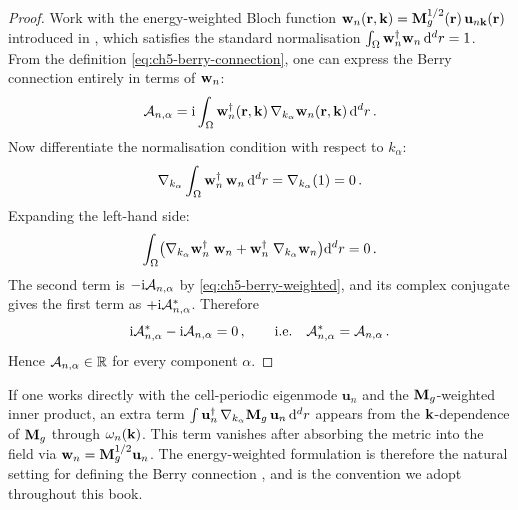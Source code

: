 \begin{proof}
Work with the energy-weighted Bloch function
$\mathbf{w}_n(\mathbf{r},\mathbf{k})=\mathbf{M}_g^{1/2}(\mathbf{r})\,\mathbf{u}_{n\mathbf{k}}(\mathbf{r})$
introduced in , which satisfies the standard
normalisation $\int_\Omega\mathbf{w}_n^\dagger\mathbf{w}_n\,\mathrm{d}^d r=1$.
From the definition \eqref{eq:ch5-berry-connection}, one can express the Berry
connection entirely in terms of $\mathbf{w}_n$:
\begin{equation}\label{eq:ch5-berry-weighted}
  \mathcal{A}_{n,\alpha}
  = \mathrm{i}\int_\Omega\mathbf{w}_n^\dagger(\mathbf{r},\mathbf{k})\,
  \nabla_{k_\alpha}\mathbf{w}_n(\mathbf{r},\mathbf{k})\,\mathrm{d}^d r\,.
\end{equation}
Now differentiate the normalisation condition with respect to $k_\alpha$:
\begin{equation}\label{eq:ch5-norm-deriv}
  \nabla_{k_\alpha}\int_\Omega
  \mathbf{w}_n^\dagger\,\mathbf{w}_n\,\mathrm{d}^d r
  = \nabla_{k_\alpha}(1) = 0\,.
\end{equation}
Expanding the left-hand side:
\begin{equation}
  \int_\Omega\bigl(
    \nabla_{k_\alpha}\mathbf{w}_n^\dagger\;\mathbf{w}_n
    + \mathbf{w}_n^\dagger\;\nabla_{k_\alpha}\mathbf{w}_n
  \bigr)\mathrm{d}^d r = 0\,.
\end{equation}
The second term is $-\mathrm{i}\mathcal{A}_{n,\alpha}$ by
\eqref{eq:ch5-berry-weighted}, and its complex conjugate gives the
first term as $+\mathrm{i}\mathcal{A}_{n,\alpha}^*$.  Therefore
\begin{equation}
  \mathrm{i}\mathcal{A}_{n,\alpha}^* - \mathrm{i}\mathcal{A}_{n,\alpha} = 0\,,
  \qquad\text{i.e.}\quad
  \mathcal{A}_{n,\alpha}^* = \mathcal{A}_{n,\alpha}\,.
\end{equation}
Hence $\mathcal{A}_{n,\alpha}\in\mathbb{R}$ for every component $\alpha$.
\end{proof}

\begin{remark}
If one works directly with the cell-periodic eigenmode $\mathbf{u}_n$
and the $\mathbf{M}_g$-weighted inner product, an extra term
$\int\mathbf{u}_n^\dagger\,\nabla_{k_\alpha}\mathbf{M}_g\,\mathbf{u}_n\,\mathrm{d}^d r$
appears from the $\mathbf{k}$-dependence of $\mathbf{M}_g$ through
$\omega_n(\mathbf{k})$.  This term vanishes after absorbing the metric into
the field via $\mathbf{w}_n=\mathbf{M}_g^{1/2}\mathbf{u}_n$.  The
energy-weighted formulation is therefore the natural setting for
defining the Berry connection \cite{gangaraj2016berry,silveirinha2016bulk},
and is the convention we adopt
throughout this book.
\end{remark}

